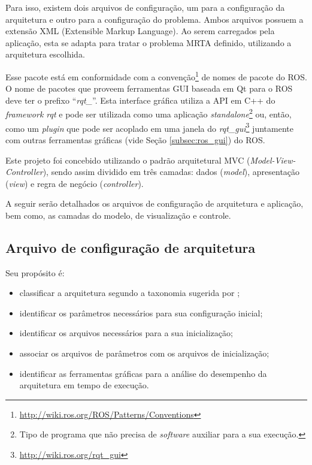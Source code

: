         Para isso, existem dois arquivos de configuração, um para a configuração da arquitetura e outro para a configuração do problema. Ambos arquivos possuem a extensão XML (Extensible Markup Language). Ao serem carregados pela aplicação, esta se adapta para tratar o problema MRTA definido, utilizando a arquitetura escolhida. 
        
        Esse pacote está em conformidade com a convenção\footnote{\url{http://wiki.ros.org/ROS/Patterns/Conventions}} de nomes de pacote do ROS. O nome de pacotes que proveem ferramentas GUI baseada em Qt para o ROS deve ter o prefixo ``\textit{rqt\_}''. Esta interface gráfica utiliza a API em C++ do \textit{framework rqt} e pode ser utilizada como uma aplicação \textit{standalone}\footnote{Tipo de programa que não precisa de \textit{software} auxiliar para a sua execução.} ou, então, como um \textit{plugin} que pode ser acoplado em uma janela do \textit{rqt\_gui}\footnote{\url{http://wiki.ros.org/rqt_gui}} juntamente com outras ferramentas gráficas (vide Seção \ref{subsec:ros_gui}) do ROS.
        
        Este projeto foi concebido utilizando o padrão arquitetural MVC (\textit{Model-View-Controller}), sendo assim dividido em três camadas: dados (\textit{model}), apresentação (\textit{view}) e regra de negócio (\textit{controller}).
        
        A seguir serão detalhados os arquivos de configuração de arquitetura e aplicação, bem como, as camadas do modelo, de visualização e controle.
        
        \subsection{Arquivo de configuração de arquitetura} \label{subsec:arch_config}
            Seu propósito é:
            
            \begin{itemize}
                \item classificar a arquitetura segundo a taxonomia sugerida por ;
                \item identificar os parâmetros necessários para sua configuração inicial;
                \item identificar os arquivos necessários para a sua inicialização;
                \item associar os arquivos de parâmetros com os arquivos de inicialização;
                \item identificar as ferramentas gráficas para a análise do desempenho da arquitetura em tempo de execução.
            \end{itemize}
            
